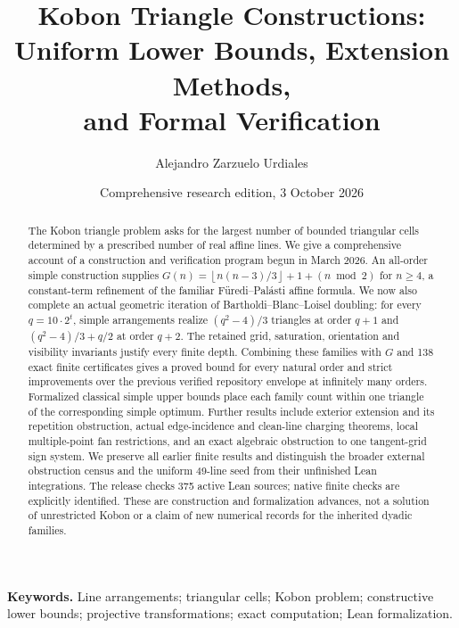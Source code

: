 \documentclass[11pt,a4paper]{article}
\title{Kobon Triangle Constructions:\\Uniform Lower Bounds, Extension Methods,\\and Formal Verification}
\author{Alejandro Zarzuelo Urdiales}
\date{Comprehensive research edition, 3 October 2026}
\theoremstyle{definition}
\theoremstyle{remark}
\newcommand{\floor}[1]{\left\lfloor#1\right\rfloor}
\begin{document}
\maketitle
\begin{abstract}
The Kobon triangle problem asks for the largest number of bounded triangular cells determined by a prescribed number of real affine lines. We give a comprehensive account of a construction and verification program begun in March 2026. An all-order simple construction supplies $G(n)=\floor{n(n-3)/3}+1+(n\bmod2)$ for $n\ge4$, a constant-term refinement of the familiar F\"uredi--Pal\'asti affine formula. We now also complete an actual geometric iteration of Bartholdi--Blanc--Loisel doubling: for every $q=10\cdot2^t$, simple arrangements realize $(q^2-4)/3$ triangles at order $q+1$ and $(q^2-4)/3+q/2$ at order $q+2$. The retained grid, saturation, orientation and visibility invariants justify every finite depth. Combining these families with $G$ and 138 exact finite certificates gives a proved bound for every natural order and strict improvements over the previous verified repository envelope at infinitely many orders. Formalized classical simple upper bounds place each family count within one triangle of the corresponding simple optimum. Further results include exterior extension and its repetition obstruction, actual edge-incidence and clean-line charging theorems, local multiple-point fan restrictions, and an exact algebraic obstruction to one tangent-grid sign system. We preserve all earlier finite results and distinguish the broader external obstruction census and the uniform 49-line seed from their unfinished Lean integrations. The release checks 375 active Lean sources; native finite checks are explicitly identified. These are construction and formalization advances, not a solution of unrestricted Kobon or a claim of new numerical records for the inherited dyadic families.
\end{abstract}
\vspace{0.4em}
\noindent\textbf{Keywords.} Line arrangements; triangular cells; Kobon problem; constructive lower bounds; projective transformations; exact computation; Lean formalization.
\clearpage
\tableofcontents
\clearpage













\clearpage
\appendix

\end{document}
